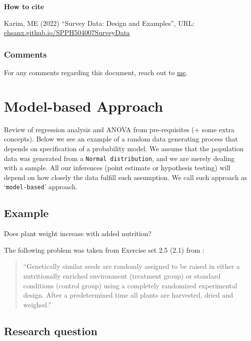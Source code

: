 \documentclass[
]{book}
\begin{document}
\begin{rmdcomment}
\textbf{How to cite}

Karim, ME (2022) ``Survey Data: Design and Examples'', URL:
\href{https://ehsanx.github.io/SPPH504007SurveyData/docs/}{ehsanx.github.io/SPPH504007SurveyData}
\end{rmdcomment}

\hypertarget{comments}{%
\subsection*{Comments}\label{comments}}

For any comments regarding this document, reach out to \href{http://ehsank.com/}{me}.

\hypertarget{tab-3}{%
\chapter{Model-based Approach}\label{tab-3}}

Review of regression analysis and ANOVA from pre-requisites (+ some extra concepts). Below we see an example of a random data generating process that depends on specification of a probability model. We assume that the population data was generated from a \texttt{Normal\ distribution}, and we are merely dealing with a sample. All our inferences (point estimate or hypothesis testing) will depend on how closely the data fulfill such assumption. We call such approach as `\texttt{model-based}' approach.

\hypertarget{example}{%
\section{Example}\label{example}}

Does plant weight increase with added nutrition?

The following problem was taken from Exercise set 2.5 (2.1) from \citet{dobson2008gml}:

\begin{quote}
``Genetically similar seeds are randomly assigned to be raised in either a nutritionally enriched environment (treatment group) or standard conditions (control group) using a completely randomized experimental design. After a predetermined time all plants are harvested, dried and weighed.''
\end{quote}

\hypertarget{research-question}{%
\section{Research question}\label{research-question}}
\end{document}
